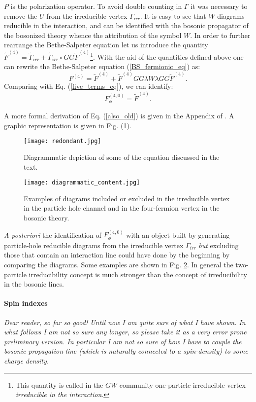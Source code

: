 \documentclass[a4paper,11pt]{article}
\begin{document}
$P$ is the polarization operator. To avoid double counting in $\Gamma$ it was necessary to remove the $U$ from the irreducible vertex $\Gamma_{irr}$. It is easy to see that $W$ diagrams reducible in the interaction, and can be identified with the bosonic propagator of the bosonized theory whence the attribution of the symbol $W$. 
In order to further rearrange the Bethe-Salpeter equation let us introduce the quantity $\tilde F^(4) = \tilde \Gamma_{irr} + \tilde \Gamma_{irr}\circ G G \tilde F^{(4)}$\footnote{This quantity is called in the $GW$ community one-particle irreducible vertex {\sl irreducible in the interaction}.}.
With the aid of the quantities defined above one can rewrite the Bethe-Salpeter equation (\ref{BS_fermionic_eq}) as: 
\begin{equation}
\label{also_old}  
F^{(4)} = \tilde F^{(4)} + \tilde F^{(4)} G G  \lambda W \lambda G G \tilde F^{(4)}.  
\end{equation}  
Comparing with Eq. (\ref{five_terms_eq}), we can identify: 
\begin{equation}
F_\phi^{(4,0)} = \tilde F^{(4)}. 
\end{equation} 

A more formal derivation of Eq. (\ref{also_old}) is given in the Appendix of \cite{Held2011}.
A graphic representation is given in Fig. (\ref{ridondante}). 
\begin{figure} 
\texttt{[image: redondant.jpg]}
\label{ridondante} 
\caption{Diagrammatic depiction of some of the equation discussed in the text.} 
\end{figure} 
\begin{figure} 
\texttt{[image: diagrammatic\_content.jpg]}
\label{aposteriori} 
\caption{Examples of diagrams included or excluded in the irreducible vertex in the particle hole channel and in the four-fermion vertex in the bosonic theory.} 
\end{figure} 
{\sl A  posteriori}  the identification of $F^{(4,0)}_\phi$ with an object built by generating particle-hole reducible diagrams from the irreducible vertex $\Gamma_{irr}$ {\sl but} excluding those that contain an interaction line could have done by the beginning by comparing the diagrams. 
Some examples are shown in Fig. \ref{aposteriori}. In general the two-particle irreducibility concept is much stronger than the concept of irreducibility in the bosonic lines.  

\paragraph{Spin indexes}  
\emph{Dear reader, so far so good! Until now I am quite sure of what I have shown. In what follows I am not so sure any longer, so please take it as a very error prone preliminary version. In particular I am not so sure of how I have to couple the bosonic propagation line (which is naturally connected to a spin-density) to some charge density.}
\end{document}
